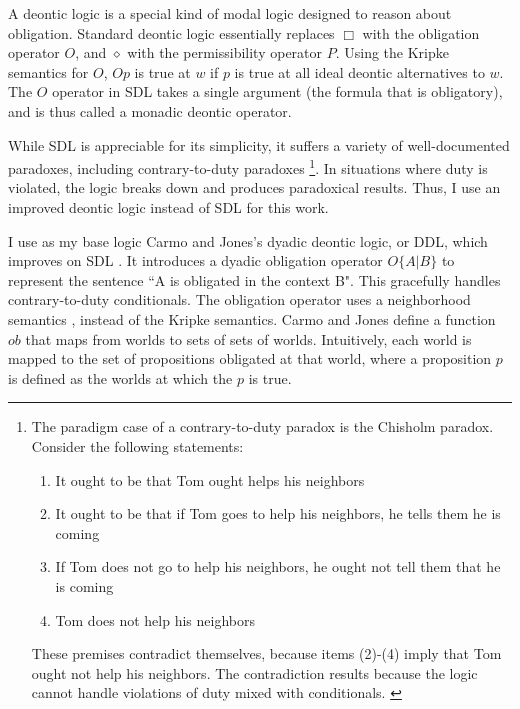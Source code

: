 \begin{isabellebody}
\begin{isamarkuptext}
A deontic logic is a special kind of modal logic designed to reason about obligation. Standard deontic
logic \cite{cresswell, sep-logic-deontic} essentially replaces $\Box$ with the obligation operator
$O$, and $\diamond$ with the permissibility operator $P$. Using the Kripke semantics for $O$, $O p$ 
is true at $w$ if $p$ is true at all  ideal deontic alternatives to $w$. The $O$ operator in SDL
takes a single argument (the formula that is obligatory), and is thus called a monadic deontic operator.

 While SDL is appreciable for its simplicity, it suffers a variety of well-documented paradoxes, 
including contrary-to-duty paradoxes \footnote{The paradigm case of a contrary-to-duty paradox is the 
Chisholm paradox. Consider the following statements: \begin{enumerate}
\item It ought to be that Tom ought helps his neighbors
\item It ought to be that if Tom goes to help his neighbors, he tells them he is coming
\item If Tom does not go to help his neighbors, he ought not tell them that he is coming
\item Tom does not help his neighbors
\end{enumerate} 
These premises contradict themselves, because items (2)-(4) imply that Tom ought not help his neighbors. The 
contradiction results because the logic cannot handle violations of duty mixed with
conditionals. \cite{chisholm, ctd}
}. 
In situations where duty is violated, the logic breaks down 
and produces paradoxical results. Thus, I use an improved deontic logic instead of SDL for this work.%
\end{isamarkuptext}\isamarkuptrue%
%
\isadelimdocument
%
\endisadelimdocument
%
\isatagdocument
%
\isamarkuptrue%
%
\endisatagdocument
{\isafolddocument}%
%
\isadelimdocument
%
\endisadelimdocument
%
\begin{isamarkuptext}%
I use as my base logic Carmo and Jones's dyadic deontic logic, or DDL, which improves on SDL \cite{CJDDL}. 
It introduces a dyadic obligation operator $O\{A \vert B\}$ 
to represent the sentence ``A is obligated in the context B". This gracefully handles contrary-to-duty
conditionals. The obligation operator uses a neighborhood semantics \cite{neighborhood1, neighborhood2}, instead of the Kripke semantics. 
Carmo and Jones define a function $ob$ that maps from worlds to sets of sets of worlds. Intuitively, 
each world is mapped to the set of propositions obligated at that world, where a proposition $p$ is defined as 
the worlds at which the $p$ is true.


\end{isamarkuptext}
\end{isabellebody}
